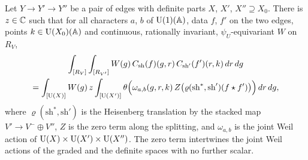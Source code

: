 \begin{theorem}\label{thm:two-steps}
Let $Y\to Y'\to Y''$ be a pair of edges with definite parts $X$, $X'$, $X''\supseteq X_0$. There is $z\in\mathbb{C}$ such that for
all characters $a$, $b$ of $\operatorname{U}(1)(\mathbb{A})$, data $f$, $f'$ on the two edges, points $k\in\operatorname{U}(X_0)(\mathbb{A})$ and continuous,
rationally invariant, $\psi_U$-equivariant $W$ on $R_V$,
\begin{multline*}
  \int_{[R_V]}\int_{[R_{V'}]}W(g)\,C_{\mathrm{sh}}(f)(g,r)\,C_{\mathrm{sh}'}(f')(r,k)\,dr\,dg\\
  =\int_{[\operatorname{U}(X)]}W(g)\,z\int_{[\operatorname{U}(X')]}\theta\Bigl(\omega_{a,b}(g,r,k)\,Z\bigl(\varrho(\mathrm{sh}^*,\mathrm{sh}')(f\star f')\bigr)\Bigr)\,dr\,dg,
\end{multline*}
where $\varrho(\mathrm{sh}^*,\mathrm{sh}')$ is the Heisenberg translation by the stacked map $V'\to V^-\oplus V''$, $Z$ is the zero
term along the splitting, and $\omega_{a,b}$ is the joint Weil action of $\operatorname{U}(X)\times\operatorname{U}(X')\times\operatorname{U}(X'')$. The zero term
intertwines the joint Weil actions of the graded and the definite spaces with no further scalar.
\end{theorem}

